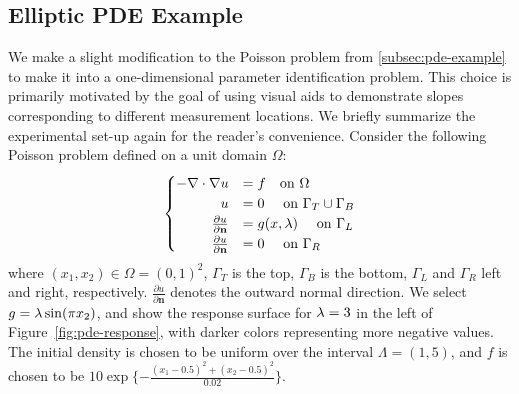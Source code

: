 \subsection{Elliptic PDE Example}\label{sec:pde-oed-example}
We make a slight modification to the Poisson problem from \ref{subsec:pde-example} to make it into a one-dimensional parameter identification problem.
This choice is primarily motivated by the goal of using visual aids to demonstrate slopes corresponding to different measurement locations.
We briefly summarize the experimental set-up again for the reader's convenience.
Consider the following Poisson problem defined on a unit domain $\Omega$:
\begin{equation}\label{eq:pde-equation}
\begin{cases}
\hfill -\nabla \cdot \nabla u &= f \quad\text{on } \Omega \\
\hfill u &= 0 \quad\text{ on } \Gamma_T \cup \Gamma_B \\
\hfill \frac{\partial u}{\partial \mathbf{n}} &= g(x,\param) \quad\text{ on } \Gamma_L \\
\hfill \frac{\partial u}{\partial \mathbf{n}} &= 0 \quad\text{ on } \Gamma_R
\end{cases}
\end{equation}
where $(x_1, x_2) \in \Omega = (0,1)^2$, $\Gamma_T$ is the top, $\Gamma_B$ is the bottom, $\Gamma_L$ and $\Gamma_R$ left and right, respectively.
$\frac{\partial u}{\partial \mathbf{n}}$ denotes the outward normal direction.
We select $g=\lambda \sin(\pi x_2)$, and show the response surface for $\lambda = 3$ in the left of Figure~\ref{fig:pde-response}, with darker colors representing more negative values.
The initial density is chosen to be uniform over the interval $\Lambda = (1,5)$, and $f$ is chosen to be $10\exp\{-\frac{(x_1-0.5)^2 + (x_2 - 0.5)^2}{0.02}\}$.


